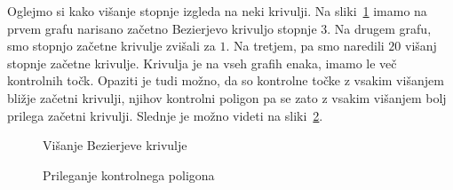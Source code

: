 \documentclass[isrm2, tisk]{fmfdelo}
\begin{document}
    Oglejmo si kako višanje stopnje izgleda na neki krivulji.
    Na sliki~\ref{fig:višanje} imamo na prvem grafu narisano začetno Bezierjevo krivuljo stopnje $3$.
    Na drugem grafu, smo stopnjo začetne krivulje zvišali za $1$.
    Na tretjem, pa smo naredili $20$ višanj stopnje začetne krivulje.
    Krivulja je na vseh grafih enaka, imamo le več kontrolnih točk.
    Opaziti je tudi možno, da so kontrolne točke z vsakim višanjem bližje začetni krivulji, njihov kontrolni poligon pa se zato z vsakim višanjem bolj prilega začetni krivulji.
    Slednje je možno videti na sliki~\ref{fig:višanje-poligon}.
    \begin{figure}[h]
        \centering
        \qquad
        \qquad
        \caption{Višanje Bezierjeve krivulje}
        \label{fig:višanje}
    \end{figure}
    \begin{figure}[h]
        \centering
        \qquad
        \caption{Prileganje kontrolnega poligona}
        \label{fig:višanje-poligon}
    \end{figure}
\end{document}
